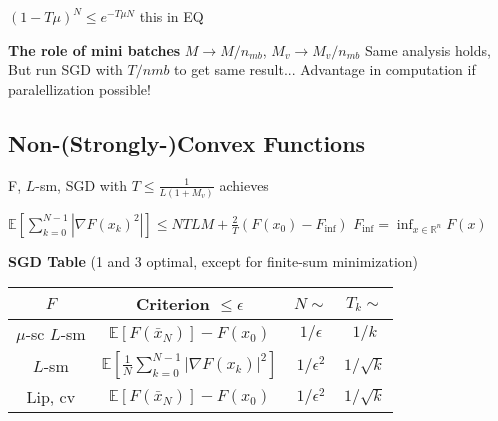 $(1-T\mu)^N\le e^{-T\mu N}$ this  in EQ

\textbf{The role of mini batches}
$M\rightarrow{M/n_{mb}}$, $M_v \rightarrow{M_v/n_{mb}}$
Same analysis holds,
But run SGD with $T/n{mb}$ to get same result...
Advantage in computation if paralellization possible!

\subsection{Non-(Strongly-)Convex Functions}

\begin{proposition}
	F, $L$-sm, SGD with
	$T\le \frac{1}{L(1+M_v)}$ achieves

	$\mathbb{E}[\sum_{k=0}^{N-1}|\nabla F(x_k)^2|]
		\le NTLM + \frac{2}{T}(F(x_0)-F_\text{inf})$
	$F_\text{inf} = \operatorname{inf}_{x\in\mathbb{R}^n}F(x)$
\end{proposition}


\textbf{SGD Table} (1 and 3 optimal, except for finite-sum minimization)
\begin{tabular}{|c|c|c|c|}
	\hline
	$F$             & Criterion                              $\leq \epsilon$       & $N \sim$       & $T_k \sim$   \\ \hline
	$\mu$-sc $L$-sm & $\mathbb{E}[F(\bar{x}_N)] - F(x_0)$                          & $1/\epsilon$   & $1/k$        \\ \hline
	$L$-sm          & $\mathbb{E}[\frac{1}{N} \sum_{k=0}^{N-1} |\nabla F(x_k)|^2]$ & $1/\epsilon^2$ & $1/\sqrt{k}$ \\ \hline
	Lip, cv         & $\mathbb{E}[F(\bar{x}_N)] - F(x_0) $                         & $1/\epsilon^2$ & $1/\sqrt{k}$ \\ \hline
\end{tabular}

